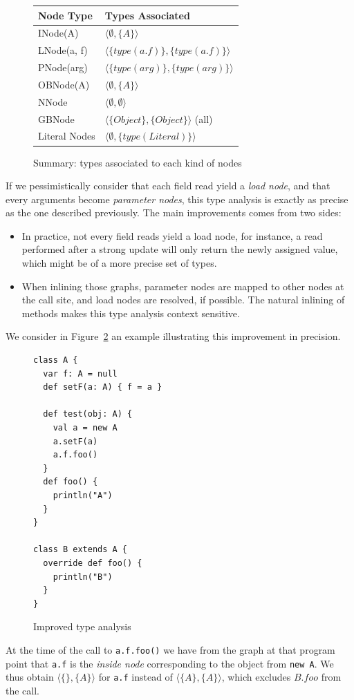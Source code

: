 \begin{figure}[h]
    \centering

    \begin{tabular}{ l | l }
        Node Type & Types Associated \\
        \hline
        INode(A)           & $\langle \emptyset, \{A\}\rangle$ \\
        LNode(a, f)        & $\langle\{type(a.f)\}, \{type(a.f)\}\rangle$ \\
        PNode(arg)         & $\langle\{type(arg)\}, \{type(arg)\}\rangle$ \\
        OBNode(A)          & $\langle \emptyset,   \{A\}\rangle$ \\
        NNode              & $\langle \emptyset,   \emptyset \rangle$ \\
        GBNode             & $\langle\{Object\},   \{Object\}\rangle$ (all)\\
        Literal Nodes      & $\langle \emptyset,   \{type(Literal)\}\rangle$\\
    \end{tabular}

    \caption{Summary: types associated to each kind of nodes}
    \label{fig:pt:types}
\end{figure}

If we pessimistically consider that each field read yield a \emph{load node},
and that every arguments become \emph{parameter nodes}, this type analysis is
exactly as precise as the one described previously. The main improvements comes
from two sides:
\begin{itemize}
    \item In practice, not every field reads yield a load node, for instance, a
read performed after a strong update will only return the newly assigned value,
which might be of a more precise set of types.
    \item When inlining those graphs, parameter nodes are mapped to other nodes
at the call site, and load nodes are resolved, if possible. The natural
inlining of methods makes this type analysis context sensitive. 
\end{itemize}
We consider in Figure~\ref{fig:pt:precise} an example illustrating this
improvement in precision.

\begin{figure}[h]
    \centering
\begin{lstlisting}
class A {
  var f: A = null
  def setF(a: A) { f = a }

  def test(obj: A) {
    val a = new A
    a.setF(a)
    a.f.foo()
  }
  def foo() {
    println("A")
  }
}

class B extends A {
  override def foo() {
    println("B")
  }
}
\end{lstlisting}
    \caption{Improved type analysis}
    \label{fig:pt:precise}
\end{figure}

At the time of the call to \verb/a.f.foo()/ we have from the graph at that
program point that \verb/a.f/ is the \emph{inside node} corresponding to the
object from \verb/new A/. We thus obtain $\langle \{\}, \{A\} \rangle$ for \verb/a.f/ instead of
$\langle \{A\}, \{A\} \rangle$, which excludes $B.foo$ from the call.
